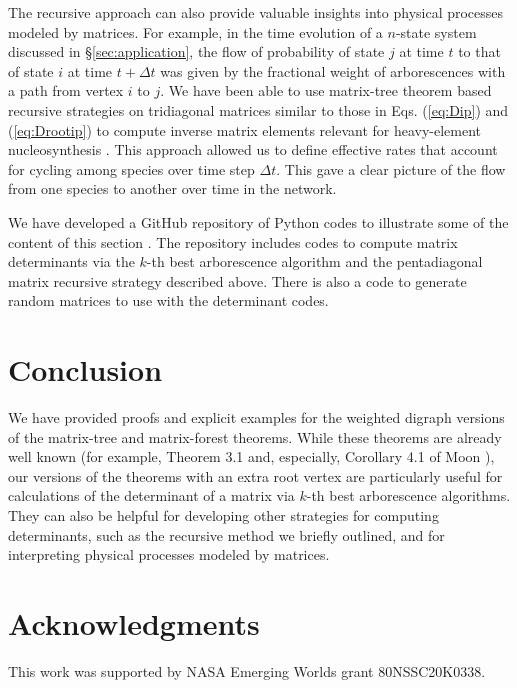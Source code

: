 \documentclass{article}
\begin{document}
The recursive approach can also provide valuable insights into physical processes modeled by matrices.  For example, in the time evolution of a $n$-state system discussed in \S \ref{sec:application}, the flow of probability of state $j$ at time $t$ to that of state $i$ at time $t + \Delta t$ was given by the fractional weight of arborescences with a path from vertex $i$ to $j$.
We have been able to use matrix-tree theorem based recursive strategies on tridiagonal matrices similar to those in Eqs. (\ref{eq:Dip}) and (\ref{eq:Drootip}) to compute inverse matrix elements relevant for heavy-element nucleosynthesis \cite{2025ApJ...982..139L}.  This approach allowed us to define effective rates that account for cycling among species over time step $\Delta t$.  This gave a clear picture of the flow from one species to another over time in the network.

We have developed a GitHub repository of Python codes to illustrate some of the content of this section \cite{Ghosh_Matrix_Digraph_2023}.  The repository includes codes to compute matrix determinants via the $k$-th best arborescence algorithm and the pentadiagonal matrix recursive strategy described above.  There is also a code to generate random matrices to use with the determinant codes.

\section{Conclusion}
We have provided proofs and explicit examples for the weighted digraph versions of the matrix-tree and matrix-forest theorems.  While these theorems are already well known (for example, Theorem 3.1 and, especially, Corollary 4.1 of Moon \cite{MOON1994163}), our versions of the theorems with an extra root vertex are particularly useful for calculations of the determinant of a matrix via $k$-th best arborescence algorithms.  They can also be helpful for developing other strategies for computing determinants, such as the recursive method we briefly outlined, and for interpreting physical processes modeled by matrices.

\section{Acknowledgments}

This work was supported by NASA Emerging Worlds grant 80NSSC20K0338.



\end{document}
